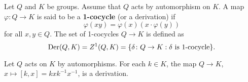 %
%
%
%
%	
%	
%


Let $Q$ and $K$ be groups. Assume that $Q$ acts by automorphism on $K$.
A map $\varphi\colon Q\to K$ is said to be a \textbf{1-cocycle} (or a derivation) if
\[
		\varphi(xy)=\varphi(x)(x\cdot\varphi(y))
\]
for all $x,y\in Q$.  The set of 1-cocycles $Q\to K$ is defined as 
\[
\operatorname{Der}(Q,K)=Z^1(Q,K)=\{\delta\colon Q\to K:\text{$\delta$ is $1$-cocycle}\}.
\]

\begin{example}
	Let $Q$ acts on $K$ by automorphisms. For each $k\in K$, the map 
	$Q\to K$, $x\mapsto [k,x]=kxk^{-1}x^{-1}$, is a derivation. 
\end{example}

